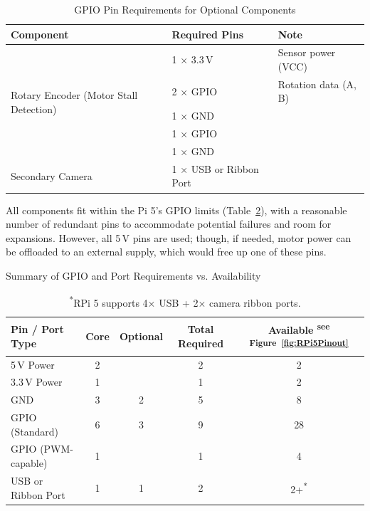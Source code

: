                \begin{table}[htbp]
                    \centering
                    \caption{GPIO Pin Requirements for Optional Components}
                    \label{tab:optionalGPIOPins}
                    \begin{tabular}{|l|l|l|}
                        \hline
                        \textbf{Component} & \textbf{Required Pins} & \textbf{Note}\\ \hline
                        \multirow{5}{*}{Rotary Encoder (Motor Stall Detection)} & 1 × 3.3\,V & Sensor power (VCC)\\ \cline{2-3}
                                                                                & 2 × GPIO & Rotation data (A, B) \\ \cline{2-3}
                                                                                & 1 × GND & \\ \hline
                        \multirow{2}{*}{Hinge Switch} & 1 × GPIO & \\ \cline{2-3}
                                                      & 1 × GND & \\ \hline
                        Secondary Camera & 1 × USB or Ribbon Port & \\ \hline
                    \end{tabular}
                \end{table}
    
                All components fit within the Pi 5's GPIO limits (Table~\ref{tab:pinSummary}), with a reasonable number of redundant pins to accommodate potential failures and room for expansions. However, all 5\,V pins are used; though, if needed, motor power can be offloaded to an external supply, which would free up one of these pins.
    
                \begin{table}[htbp]
                    \centering
                    \caption{Summary of GPIO and Port Requirements vs. Availability}
                    \label{tab:pinSummary}
                    \begin{tabular}{|l|c|c|c|c|}
                        \hline
                        \textbf{Pin / Port Type} & \textbf{Core}& \textbf{Optional}& \textbf{Total Required} & \textbf{Available} \textsuperscript{see Figure~\ref{fig:RPi5Pinout}
    }}\\ \hline
                        5\,V Power & 2 & & 2 & 2 \\ \hline
                        3.3\,V Power & 1 & & 1& 2 \\ \hline
                        GND & 3 & 2 & 5 & 8 \\ \hline
                        GPIO (Standard) & 6 & 3 & 9 & 28 \\ \hline
                        GPIO (PWM-capable) & 1 & & 1 & 4 \\ \hline
                        USB or Ribbon Port & 1 & 1 & 2 & 2+\textsuperscript{*}\\ \hline
                    \end{tabular}
                    \caption*{\textsuperscript{*}RPi 5 supports 4× USB + 2× camera ribbon ports.}
                \end{table}
    
